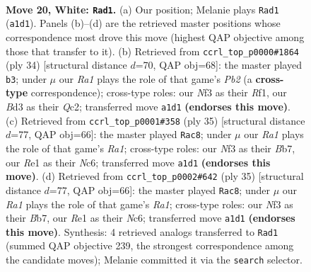 \documentclass[11pt]{article}
\begin{document}
\clearpage

\begin{figure}[p]\centering
\begin{subfigure}{0.46\textwidth}\centering
\resizebox{\linewidth}{!}{%
\newchessgame
\chessboard[
  setfen={rnbqr1k1/5p2/1p2pnp1/7p/p2P4/B1PB1NPP/P1Q2P2/R3R1K1 w - - 3 20},
  showmover=false,
  pgfstyle=straightmove, color=movearrow, markmove={a1-d1}
]}
\caption{}
\end{subfigure}\hfill
\begin{subfigure}{0.46\textwidth}\centering
\resizebox{\linewidth}{!}{%
\newchessgame
\chessboard[
  setfen={r1r3k1/p1q1bppp/3ppn2/8/RBPP4/6P1/1PQ1NP1P/5RK1 w - - 3 18},
  showmover=false,
  pgfstyle=straightmove, color=movearrow, markmove={b2-b3}
]}
\caption{}
\end{subfigure}
\\[4pt]
\begin{subfigure}{0.46\textwidth}\centering
\resizebox{\linewidth}{!}{%
\newchessgame
\chessboard[
  setfen={r2r2k1/pb2qpp1/1pn1p2p/8/3PP3/P2BQNP1/5PP1/R2R2K1 b - - 4 18},
  showmover=false,
  pgfstyle=straightmove, color=movearrow, markmove={a8-c8}
]}
\caption{}
\end{subfigure}\hfill
\begin{subfigure}{0.46\textwidth}\centering
\resizebox{\linewidth}{!}{%
\newchessgame
\chessboard[
  setfen={r2r2k1/pb2qpp1/1pn1p2p/8/3PP3/P2BQNP1/5PP1/R2R2K1 b - - 4 18},
  showmover=false,
  pgfstyle=straightmove, color=movearrow, markmove={a8-c8}
]}
\caption{}
\end{subfigure}
\caption{\textbf{Move 20, White: \texttt{Rad1}.} (a) Our position; Melanie plays \texttt{Rad1} (\texttt{a1d1}). Panels (b)--(d) are the retrieved master positions whose correspondence most drove this move (highest QAP objective among those that transfer to it). (b) Retrieved from \texttt{ccrl\_top\_p0000\#1864} (ply 34) [structural distance $d$=70, QAP obj=68]: the master played \texttt{b3}; under $\mu$ our \emph{Ra1} plays the role of that game's \emph{Pb2} (a \textbf{cross-type} correspondence); cross-type roles: our \emph{N}f3 as their \emph{R}f1, our \emph{B}d3 as their \emph{Q}c2; transferred move \texttt{a1d1} \textbf{(endorses this move)}. (c) Retrieved from \texttt{ccrl\_top\_p0001\#358} (ply 35) [structural distance $d$=77, QAP obj=66]: the master played \texttt{Rac8}; under $\mu$ our \emph{Ra1} plays the role of that game's \emph{Ra1}; cross-type roles: our \emph{N}f3 as their \emph{B}b7, our \emph{R}e1 as their \emph{N}c6; transferred move \texttt{a1d1} \textbf{(endorses this move)}. (d) Retrieved from \texttt{ccrl\_top\_p0002\#642} (ply 35) [structural distance $d$=77, QAP obj=66]: the master played \texttt{Rac8}; under $\mu$ our \emph{Ra1} plays the role of that game's \emph{Ra1}; cross-type roles: our \emph{N}f3 as their \emph{B}b7, our \emph{R}e1 as their \emph{N}c6; transferred move \texttt{a1d1} \textbf{(endorses this move)}. Synthesis: 4 retrieved analogs transferred to \texttt{Rad1} (summed QAP objective 239, the strongest correspondence among the candidate moves); Melanie committed it via the \texttt{search} selector.}
\label{fig:thought-m38}
\end{figure}
\end{document}
